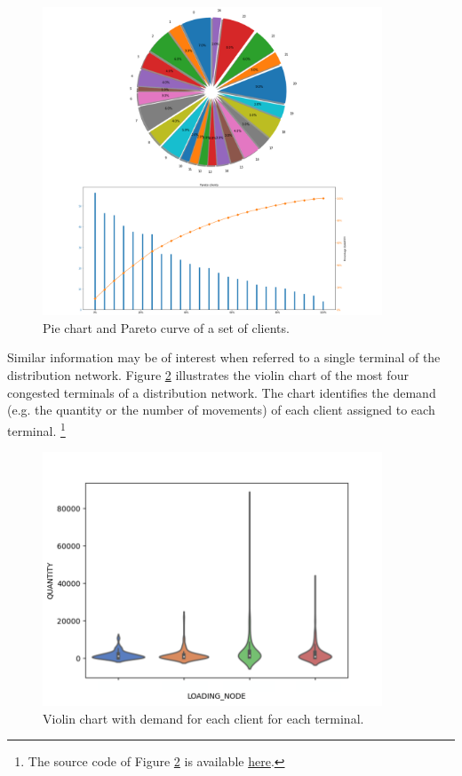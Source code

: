 \begin{figure}[hbt!]
\centering
\includegraphics[width=0.9\textwidth]{SectionDistribution/control_figures/fig_paretoClient.png}
\captionsetup{type=figure}
\caption{Pie chart and Pareto curve of a set of clients.}
\label{fig_paretoClient}
\end{figure}

Similar information may be of interest when referred to a single terminal of the distribution network. Figure \ref{fig_violinClient} illustrates the violin chart of the most four congested terminals of a distribution network. The chart identifies the demand (e.g. the quantity or the number of movements) of each client assigned to each terminal. \footnote{The source code of Figure \ref{fig_violinClient} is available \href{https://github.com/aletuf93/logproj/blob/master/examples/DIST_01\%20Supply\%20Chain\%20Assessment.ipynb}{here}.}

\begin{figure}[hbt!]
\centering
\includegraphics[width=0.9\textwidth]{SectionDistribution/control_figures/fig_violinClient.png}
\captionsetup{type=figure}
\caption{Violin chart with demand for each client for each terminal.}
\label{fig_violinClient}
\end{figure}

